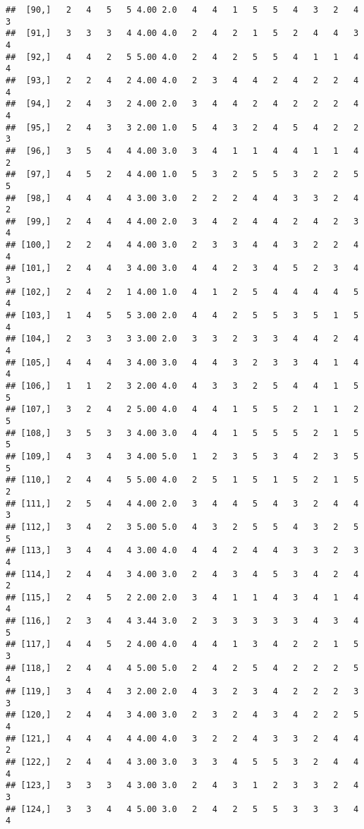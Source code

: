 \documentclass[]{article}
\begin{document}
\begin{verbatim}
##  [90,]   2   4   5   5 4.00 2.0   4   4   1   5   5   4   3   2   4   3
##  [91,]   3   3   3   4 4.00 4.0   2   4   2   1   5   2   4   4   3   4
##  [92,]   4   4   2   5 5.00 4.0   2   4   2   5   5   4   1   1   4   4
##  [93,]   2   2   4   2 4.00 4.0   2   3   4   4   2   4   2   2   4   4
##  [94,]   2   4   3   2 4.00 2.0   3   4   4   2   4   2   2   2   4   4
##  [95,]   2   4   3   3 2.00 1.0   5   4   3   2   4   5   4   2   2   3
##  [96,]   3   5   4   4 4.00 3.0   3   4   1   1   4   4   1   1   4   2
##  [97,]   4   5   2   4 4.00 1.0   5   3   2   5   5   3   2   2   5   5
##  [98,]   4   4   4   4 3.00 3.0   2   2   2   4   4   3   3   2   4   2
##  [99,]   2   4   4   4 4.00 2.0   3   4   2   4   4   2   4   2   3   4
## [100,]   2   2   4   4 4.00 3.0   2   3   3   4   4   3   2   2   4   4
## [101,]   2   4   4   3 4.00 3.0   4   4   2   3   4   5   2   3   4   3
## [102,]   2   4   2   1 4.00 1.0   4   1   2   5   4   4   4   4   5   4
## [103,]   1   4   5   5 3.00 2.0   4   4   2   5   5   3   5   1   5   4
## [104,]   2   3   3   3 3.00 2.0   3   3   2   3   3   4   4   2   4   4
## [105,]   4   4   4   3 4.00 3.0   4   4   3   2   3   3   4   1   4   4
## [106,]   1   1   2   3 2.00 4.0   4   3   3   2   5   4   4   1   5   5
## [107,]   3   2   4   2 5.00 4.0   4   4   1   5   5   2   1   1   2   5
## [108,]   3   5   3   3 4.00 3.0   4   4   1   5   5   5   2   1   5   5
## [109,]   4   3   4   3 4.00 5.0   1   2   3   5   3   4   2   3   5   5
## [110,]   2   4   4   5 5.00 4.0   2   5   1   5   1   5   2   1   5   2
## [111,]   2   5   4   4 4.00 2.0   3   4   4   5   4   3   2   4   4   3
## [112,]   3   4   2   3 5.00 5.0   4   3   2   5   5   4   3   2   5   5
## [113,]   3   4   4   4 3.00 4.0   4   4   2   4   4   3   3   2   3   4
## [114,]   2   4   4   3 4.00 3.0   2   4   3   4   5   3   4   2   4   2
## [115,]   2   4   5   2 2.00 2.0   3   4   1   1   4   3   4   1   4   4
## [116,]   2   3   4   4 3.44 3.0   2   3   3   3   3   3   4   3   4   5
## [117,]   4   4   5   2 4.00 4.0   4   4   1   3   4   2   2   1   5   3
## [118,]   2   4   4   4 5.00 5.0   2   4   2   5   4   2   2   2   5   4
## [119,]   3   4   4   3 2.00 2.0   4   3   2   3   4   2   2   2   3   3
## [120,]   2   4   4   3 4.00 3.0   2   3   2   4   3   4   2   2   5   4
## [121,]   4   4   4   4 4.00 4.0   3   2   2   4   3   3   2   4   4   2
## [122,]   2   4   4   4 3.00 3.0   3   3   4   5   5   3   2   4   4   4
## [123,]   3   3   3   4 3.00 3.0   2   4   3   1   2   3   3   2   4   3
## [124,]   3   3   4   4 5.00 3.0   2   4   2   5   5   3   3   3   4   4

\end{verbatim}
\end{document}
